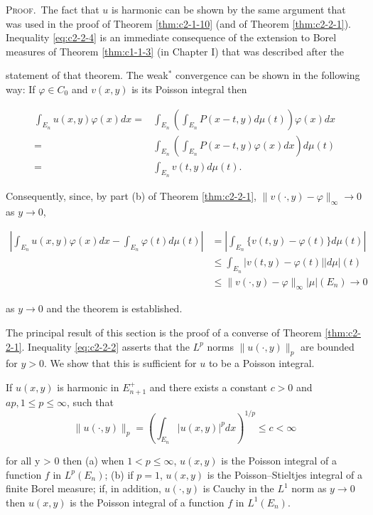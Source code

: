 \textsc{Proof.}\ The fact that $u$ is harmonic can be shown by the same argument that was used in the proof of Theorem \ref{thm:c2-1-10} (and of Theorem \ref{thm:c2-2-1}). Inequality \eqref{eq:c2-2-4} is an immediate consequence of the extension to Borel measures of Theorem \ref{thm:c1-1-3} (in Chapter I) that was described after the

statement of that theorem. The weak$^{*}$ convergence can be shown in the following way: If $\varphi \in C_0$ and $v(x, y)$ is its Poisson integral then

\[
\begin{aligned}\int_{E_{n}}u(x,y)\varphi(x)dx=&\int_{E_{n}}\left(\int_{E_{n}}P(x-t,y)d\mu(t)\right)\varphi(x)dx\\=&\int_{E_{n}}\left(\int_{E_{n}}P(x-t,y)\varphi(x)dx\right)d\mu(t)\\=&\int_{E_{n}}v(t,y)d\mu(t).\end{aligned}
\]

Consequently, since, by part (b) of Theorem \ref{thm:c2-2-1}, $\|v(\cdot, y) - \varphi\|_\infty \to 0$ as $y \to 0$,

\[
\begin{aligned}\left|\int_{E_{n}}u(x,y)\varphi(x)dx-\int_{E_{n}}\varphi(t)d\mu(t)\right|&=\left|\int_{E_{n}}\{v(t,y)-\varphi(t)\}d\mu(t)\right|\\&\leq\int_{E_{n}}|v(t,y)-\varphi(t)||d\mu|(t)\\&\leq\|v(\cdot,y)-\varphi\|_{\infty}|\mu|(E_{n})\to0\end{aligned}
\]

as $y \to 0$ and the theorem is established.

The principal result of this section is the proof of a converse of Theorem \ref{thm:c2-2-1}. Inequality \eqref{eq:c2-2-2} asserts that the $L^p$ norms $\|u(\cdot, y)\|_p$ are bounded for $y > 0$. We show that this is sufficient for $u$ to be a Poisson integral.

\begin{theorem}
\label{thm:c2-2-5}
If $u(x, y)$ is harmonic in $E_{n+1}^+$ and there exists a constant $c > 0$ and $a p, 1 \leq p \leq \infty$, such that
\[
\|u(\cdot,y)\|_{p}=\left(\int_{E_{n}}|u(x,y)|^{p}d x\right)^{1/p}\leq c<\infty
\]

for all y > 0 then
(a) when $1 < p \leq \infty$, $u(x, y)$ is the Poisson integral of a function $f$ in $L^p(E_n)$;
(b) if $p = 1$, $u(x, y)$ is the Poisson--Stieltjes integral of a finite Borel measure; if, in addition, $u(\cdot, y)$ is Cauchy in the $L^1$ norm as $y \to 0$ then $u(x, y)$ is the Poisson integral of a function $f$ in $L^1(E_n)$.
\end{theorem}

